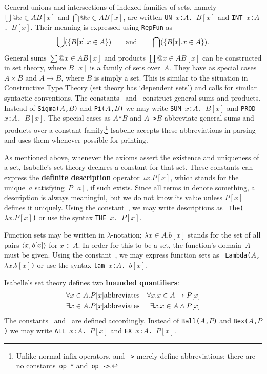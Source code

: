 General unions and intersections of indexed
families of sets, namely $\bigcup@{x\in A}B[x]$ and $\bigcap@{x\in A}B[x]$,
are written \hbox{\tt UN $x$:$A$.\ $B[x]$} and \hbox{\tt INT $x$:$A$.\ $B[x]$}.
Their meaning is expressed using \texttt{RepFun} as
\[
\bigcup(\{B[x]. x\in A\}) \qquad\hbox{and}\qquad 
\bigcap(\{B[x]. x\in A\}). 
\]
General sums $\sum@{x\in A}B[x]$ and products $\prod@{x\in A}B[x]$ can be
constructed in set theory, where $B[x]$ is a family of sets over~$A$.  They
have as special cases $A\times B$ and $A\to B$, where $B$ is simply a set.
This is similar to the situation in Constructive Type Theory (set theory
has `dependent sets') and calls for similar syntactic conventions.  The
constants~ and~ construct general sums and
products.  Instead of \texttt{Sigma($A$,$B$)} and \texttt{Pi($A$,$B$)} we may
write 
\hbox{\tt SUM $x$:$A$.\ $B[x]$} and \hbox{\tt PROD $x$:$A$.\ $B[x]$}.  
%
The special cases as \hbox{\tt$A$*$B$} and \hbox{\tt$A$->$B$} abbreviate
general sums and products over a constant family.\footnote{Unlike normal
infix operators, {\tt*} and {\tt->} merely define abbreviations; there are
no constants~\texttt{op~*} and~\hbox{\tt op~->}.} Isabelle accepts these
abbreviations in parsing and uses them whenever possible for printing.

As mentioned above, whenever the axioms assert the existence and uniqueness
of a set, Isabelle's set theory declares a constant for that set.  These
constants can express the {\bf definite description} operator~$\iota
x. P[x]$, which stands for the unique~$a$ satisfying~$P[a]$, if such exists.
Since all terms in {\ZF} denote something, a description is always
meaningful, but we do not know its value unless $P[x]$ defines it uniquely.
Using the constant~, we may write descriptions as {\tt
  The($\lambda x. P[x]$)} or use the syntax \hbox{\tt THE $x$.\ $P[x]$}.

Function sets may be written in $\lambda$-notation; $\lambda x\in A. b[x]$
stands for the set of all pairs $\langle x,b[x]\rangle$ for $x\in A$.  In order for
this to be a set, the function's domain~$A$ must be given.  Using the
constant~, we may express function sets as {\tt
Lambda($A$,$\lambda x. b[x]$)} or use the syntax \hbox{\tt lam $x$:$A$.\ $b[x]$}.

Isabelle's set theory defines two {\bf bounded quantifiers}:
\begin{eqnarray*}
   \forall x\in A. P[x] &\hbox{abbreviates}& \forall x. x\in A\rightarrow P[x] \\
   \exists x\in A. P[x] &\hbox{abbreviates}& \exists x. x\in A\wedge P[x]
\end{eqnarray*}
The constants~ and~ are defined
accordingly.  Instead of \texttt{Ball($A$,$P$)} and \texttt{Bex($A$,$P$)} we may
write
\hbox{\tt ALL $x$:$A$.\ $P[x]$} and \hbox{\tt EX $x$:$A$.\ $P[x]$}.


